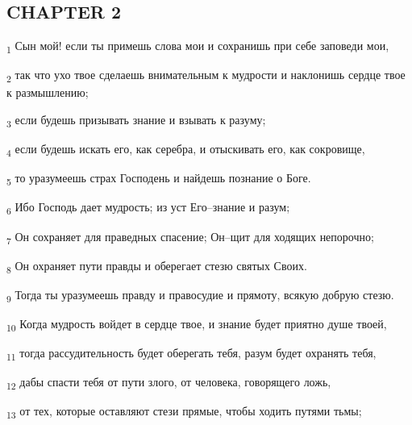 \subsection{CHAPTER 2}
\begin{tcolorbox}
\textsubscript{1} Сын мой! если ты примешь слова мои и сохранишь при себе заповеди мои,
\end{tcolorbox}
\begin{tcolorbox}
\textsubscript{2} так что ухо твое сделаешь внимательным к мудрости и наклонишь сердце твое к размышлению;
\end{tcolorbox}
\begin{tcolorbox}
\textsubscript{3} если будешь призывать знание и взывать к разуму;
\end{tcolorbox}
\begin{tcolorbox}
\textsubscript{4} если будешь искать его, как серебра, и отыскивать его, как сокровище,
\end{tcolorbox}
\begin{tcolorbox}
\textsubscript{5} то уразумеешь страх Господень и найдешь познание о Боге.
\end{tcolorbox}
\begin{tcolorbox}
\textsubscript{6} Ибо Господь дает мудрость; из уст Его--знание и разум;
\end{tcolorbox}
\begin{tcolorbox}
\textsubscript{7} Он сохраняет для праведных спасение; Он--щит для ходящих непорочно;
\end{tcolorbox}
\begin{tcolorbox}
\textsubscript{8} Он охраняет пути правды и оберегает стезю святых Своих.
\end{tcolorbox}
\begin{tcolorbox}
\textsubscript{9} Тогда ты уразумеешь правду и правосудие и прямоту, всякую добрую стезю.
\end{tcolorbox}
\begin{tcolorbox}
\textsubscript{10} Когда мудрость войдет в сердце твое, и знание будет приятно душе твоей,
\end{tcolorbox}
\begin{tcolorbox}
\textsubscript{11} тогда рассудительность будет оберегать тебя, разум будет охранять тебя,
\end{tcolorbox}
\begin{tcolorbox}
\textsubscript{12} дабы спасти тебя от пути злого, от человека, говорящего ложь,
\end{tcolorbox}
\begin{tcolorbox}
\textsubscript{13} от тех, которые оставляют стези прямые, чтобы ходить путями тьмы;
\end{tcolorbox}
